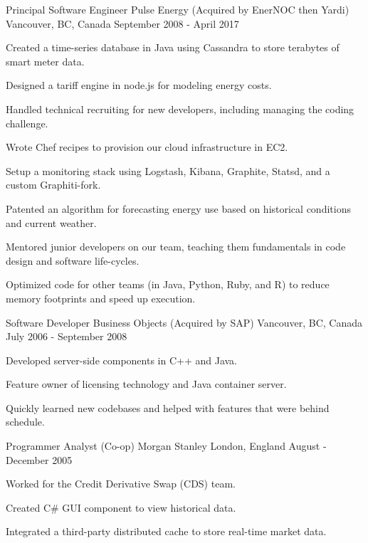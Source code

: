 \begin{cventries}
  \cventry
    {Principal Software Engineer} %
    {Pulse Energy (Acquired by EnerNOC then Yardi)} %
    {Vancouver, BC, Canada} %
    {September 2008 - April 2017} %
    {
      \begin{cvitems} %
        \item {Created a time-series database in Java using Cassandra to store terabytes of smart meter data.}
        \item {Designed a tariff engine in node.js for modeling energy costs.}
        \item {Handled technical recruiting for new developers, including managing the coding challenge.}
        \item {Wrote Chef recipes to provision our cloud infrastructure in EC2.}
        \item {Setup a monitoring stack using Logstash, Kibana, Graphite, Statsd, and a custom Graphiti-fork.}
        \item {Patented an algorithm for forecasting energy use based on historical conditions and current weather.}
        \item {Mentored junior developers on our team, teaching them fundamentals in code design and software life-cycles.}
        \item {Optimized code for other teams (in Java, Python, Ruby, and R) to reduce memory footprints and speed up execution.}
      \end{cvitems}
    }

  \cventry
    {Software Developer} %
    {Business Objects (Acquired by SAP)} %
    {Vancouver, BC, Canada} %
    {July 2006 - September 2008} %
    {
      \begin{cvitems} %
        \item {Developed server-side components in C++ and Java.}
        \item {Feature owner of licensing technology and Java container server.}
        \item {Quickly learned new codebases and helped with features that were behind schedule.}
      \end{cvitems}
    }

  \cventry
    {Programmer Analyst (Co-op)} %
    {Morgan Stanley} %
    {London, England} %
    {August - December 2005} %
    {
      \begin{cvitems} %
        \item {Worked for the Credit Derivative Swap (CDS) team.}
        \item {Created C\# GUI component to view historical data.}
        \item {Integrated a third-party distributed cache to store real-time market data.}
      \end{cvitems}
    }


\end{cventries}
